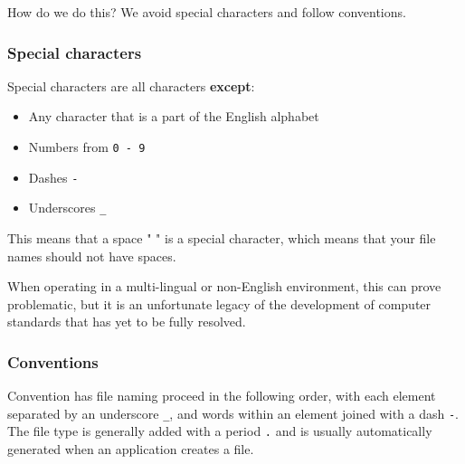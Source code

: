 \documentclass[
]{book}
\providecommand{\tightlist}{%
  \setlength{\itemsep}{0pt}\setlength{\parskip}{0pt}}
\begin{document}
How do we do this? We avoid special characters and follow conventions.

\hypertarget{special-characters}{%
\subsubsection*{Special characters}\label{special-characters}}

Special characters are all characters \textbf{except}:

\begin{itemize}
\tightlist
\item
  Any character that is a part of the English alphabet
\item
  Numbers from \texttt{0\ -\ 9}
\item
  Dashes \texttt{-}
\item
  Underscores \texttt{\_}
\end{itemize}

This means that a space " " is a special character, which means that your file names should not have spaces.

When operating in a multi-lingual or non-English environment, this can prove problematic, but it is an unfortunate legacy of the development of computer standards that has yet to be fully resolved.

\hypertarget{conventions}{%
\subsubsection*{Conventions}\label{conventions}}

Convention has file naming proceed in the following order, with each element separated by an underscore \texttt{\_}, and words within an element joined with a dash \texttt{-}. The file type is generally added with a period \texttt{.} and is usually automatically generated when an application creates a file.
\end{document}
